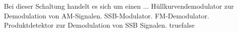     {Bei dieser Schaltung handelt es sich um einen ...}
    {Hüllkurvendemodulator zur Demodulation von AM-Signalen.}
    {SSB-Modulator.}
    {FM-Demodulator.}
    {Produktdetektor zur Demodulation von SSB Signalen.}
    {true}{false}